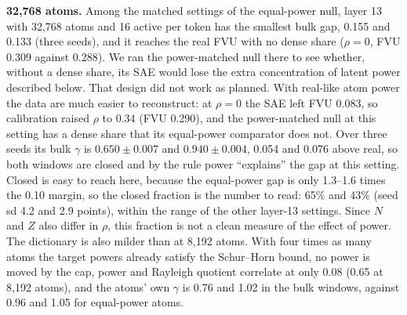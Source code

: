 \documentclass{article}
\begin{document}
\textbf{32,768 atoms.} Among the matched settings of the equal-power null, layer 13 with 32,768 atoms and 16 active per token has the smallest bulk gap, 0.155 and 0.133 (three seeds), and it reaches the real FVU with no dense share ($\rho=0$, FVU 0.309 against 0.288). We ran the power-matched null there to see whether, without a dense share, its SAE would lose the extra concentration of latent power described below. That design did not work as planned. With real-like atom power the data are much easier to reconstruct: at $\rho=0$ the SAE left FVU 0.083, so calibration raised $\rho$ to 0.34 (FVU 0.290), and the power-matched null at this setting has a dense share that its equal-power comparator does not. Over three seeds its bulk $\gamma$ is $0.650\pm0.007$ and $0.940\pm0.004$, 0.054 and 0.076 above real, so both windows are closed and by the rule power ``explains'' the gap at this setting. Closed is easy to reach here, because the equal-power gap is only 1.3--1.6 times the 0.10 margin, so the closed fraction is the number to read: 65\% and 43\% (seed sd 4.2 and 2.9 points), within the range of the other layer-13 settings. Since $N$ and $Z$ also differ in $\rho$, this fraction is not a clean measure of the effect of power. The dictionary is also milder than at 8,192 atoms. With four times as many atoms the target powers already satisfy the Schur--Horn bound, no power is moved by the cap, power and Rayleigh quotient correlate at only 0.08 (0.65 at 8,192 atoms), and the atoms' own $\gamma$ is 0.76 and 1.02 in the bulk windows, against 0.96 and 1.05 for equal-power atoms.
\end{document}
